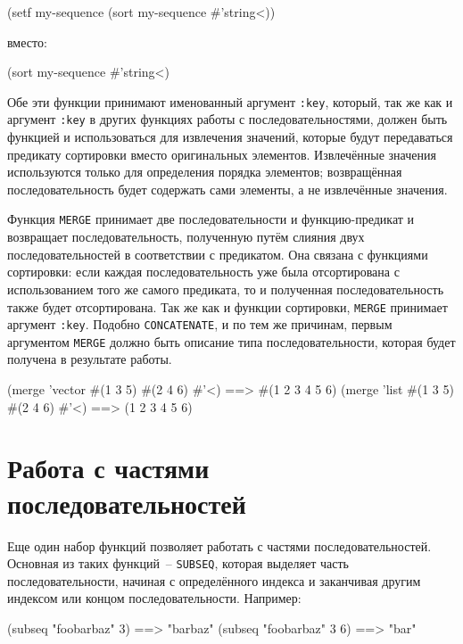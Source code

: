 \begin{myverb}
  (setf my-sequence (sort my-sequence #'string<))
\end{myverb}

\noindent{}вместо:

\begin{myverb}
  (sort my-sequence #'string<)
\end{myverb}

Обе эти функции принимают именованный аргумент \lstinline{:key}, который, так же как и аргумент
\lstinline{:key} в других функциях работы с последовательностями, должен быть функцией и
использоваться для извлечения значений, которые будут передаваться предикату сортировки
вместо оригинальных элементов.  Извлечённые значения используются только для определения
порядка элементов; возвращённая последовательность будет содержать сами элементы, а не
извлечённые значения.

Функция \lstinline{MERGE} принимает две последовательности и функцию-предикат и возвращает
последовательность, полученную путём слияния двух последовательностей в соответствии с
предикатом.  Она связана с функциями сортировки: если каждая последовательность
уже была отсортирована с использованием того же самого предиката, то и полученная
последовательность также будет отсортирована.  Так же как и функции сортировки,
\lstinline{MERGE} принимает аргумент \lstinline{:key}.  Подобно \lstinline{CONCATENATE}, и по тем же
причинам, первым аргументом \lstinline{MERGE} должно быть описание типа последовательности,
которая будет получена в результате работы.

\begin{myverb}
  (merge 'vector #(1 3 5) #(2 4 6) #'<) ==> #(1 2 3 4 5 6)
  (merge 'list #(1 3 5) #(2 4 6) #'<)   ==> (1 2 3 4 5 6)
\end{myverb}

\section{Работа с частями последовательностей}

Еще один набор функций позволяет работать с частями последовательностей.  Основная из
таких функций~-- \lstinline{SUBSEQ}, которая выделяет часть последовательности,
начиная с определённого индекса и заканчивая другим индексом или концом
последовательности.  Например:

\begin{myverb}
  (subseq "foobarbaz" 3)   ==> "barbaz"
  (subseq "foobarbaz" 3 6) ==> "bar"
\end{myverb}

